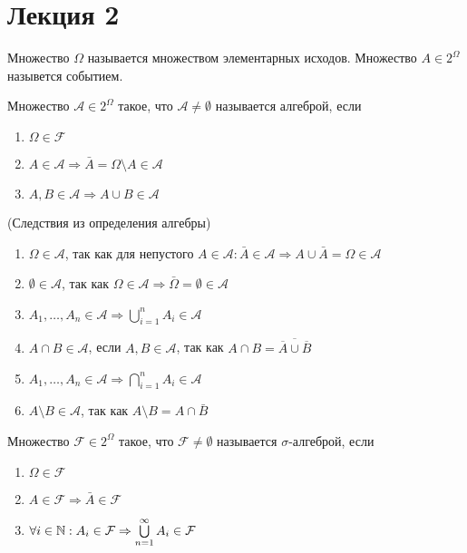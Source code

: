 \documentclass[a4paper, 12pt]{article}
\begin{document}
\section{Лекция 2}
\begin{definition}
    Множество $\Omega$ называется множеством элементарных исходов. Множество $A\in 2^{\Omega}$ назывется событием.
\end{definition}
\begin{definition}
    Множество $\mathcal{A}\in 2^{\Omega}$ такое, что $\mathcal{A}\ne \emptyset$ называется алгеброй, если
    \begin{enumerate}
        \item $\Omega \in \mathcal{F}$
        \item $A\in \mathcal{A} \Rightarrow \bar{A}=\Omega\setminus A\in \mathcal{A}$
        \item $A,B\in \mathcal{A} \Rightarrow A\cup B\in \mathcal{A}$
    \end{enumerate}
\end{definition}
\begin{statement} (Следствия из определения алгебры)
    \begin{enumerate}
        \item $\Omega\in \mathcal{A}$, так как для непустого $A\in \mathcal{A}: \bar{A}\in \mathcal{A} \Rightarrow A\cup\bar{A}=\Omega\in \mathcal{A}$
        \item $\emptyset\in \mathcal{A}$, так как $\Omega\in \mathcal{A} \Rightarrow \bar{\Omega}=\emptyset\in \mathcal{A}$
        \item $A_1,\dots,A_n \in \mathcal{A} \Rightarrow \bigcup\limits_{i=1}^n A_i\in \mathcal{A}$
        \item $A\cap B\in \mathcal{A}$, если $A,B\in \mathcal{A}$, так как $A\cap B=\overline{\overline{A}\cup\overline{B}}$
        \item $A_1,\dots,A_n \in \mathcal{A} \Rightarrow \bigcap\limits_{i=1}^n A_i\in \mathcal{A}$
        \item $A\setminus B\in \mathcal{A}$, так как $A\setminus B=A\cap \bar{B}$
    \end{enumerate}
\end{statement}
\begin{definition}
    Множество $\mathcal{F}\in 2^{\Omega}$ такое, что $\mathcal{F}\ne \emptyset$ называется $\sigma$-алгеброй, если
    \begin{enumerate}
        \item $\Omega \in \mathcal{F}$
        \item $A\in \mathcal{F} \Rightarrow \bar{A}\in \mathcal{F}$
        \item $\forall i\in \mathbb{N}: A_i\in \mathcal{F} \Rightarrow \bigcup\limits_{n=1}^{\infty}A_i\in \mathcal{F}$
    \end{enumerate} 
\end{definition}
\end{document}
